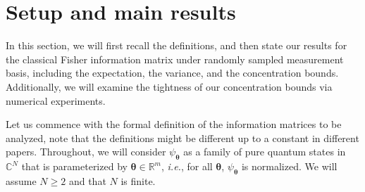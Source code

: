 \documentclass{amsart}
\theoremstyle{plain}
\theoremstyle{definition}
\theoremstyle{remark}
\newcommand{\RR}{\mathbb{R}}
\newcommand{\CC}{\mathbb{C}}
\begin{document}
\section{Setup and main results}\label{sec:main}

In this section, we will first recall the definitions, and then state our results for the classical Fisher information matrix under randomly sampled measurement basis, including the expectation, the variance, and the concentration bounds. Additionally, we will examine the tightness of our concentration bounds via numerical experiments.

Let us commence with the formal definition of the information matrices to be analyzed, note that the definitions might be different up to a constant in different papers. 
Throughout, we will consider $\psi_{\bm\theta}$ as a family of pure quantum states in $\CC^N$ that is parameterized by $\bm\theta\in\RR^m$, \textit{i.e.}, for all $\bm\theta$, $\psi_{\bm\theta}$ is normalized. 
We will assume $N \geq 2$ and that $N$ is finite.
\end{document}
